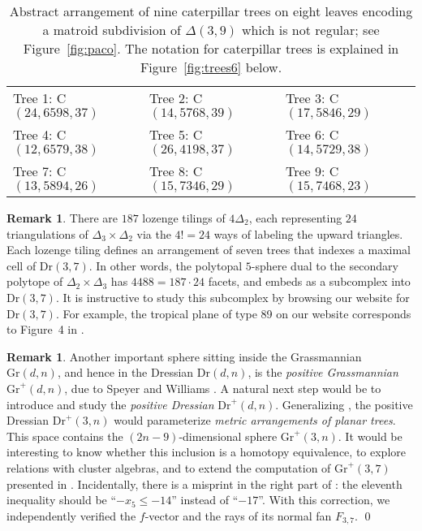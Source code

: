 \documentclass[12pt,a4paper]{amsart}
\theoremstyle{definition}
\newtheorem{remark}[thm]{Remark}
\newcommand{\Gr}{{\mathrm{Gr}}}
\newcommand{\Dr}{{\mathrm{Dr}}}
\begin{document}
\begin{table}[ht]\centering
  \caption{Abstract arrangement of nine caterpillar trees on eight
    leaves encoding a matroid subdivision of $\Delta(3,9)$ which is
    not regular; see Figure~\ref{fig:paco}.  The notation for
    caterpillar trees is explained in Figure~\ref{fig:trees6} below.}
  \renewcommand{\arraystretch}{0.9}
  \begin{tabular*}{.9\linewidth}{@{\extracolsep{\fill}}lll@{}}
    \toprule
    Tree 1: C$(24,6598,37)$ & Tree 2: C$(14,5768,39)$ & Tree 3: C$(17,5846,29)$ \\
    Tree 4: C$(12,6579,38)$ & Tree 5: C$(26,4198,37)$ & Tree 6: C$(14,5729,38)$ \\
    Tree 7: C$(13,5894,26)$ & Tree 8: C$(15,7346,29)$ & Tree 9: C$(15,7468,23)$ \\
    \bottomrule
  \end{tabular*}
  \label{tab:paco}
\end{table}

\begin{remark} 
  There are $187$ lozenge tilings of $4 \Delta_2$, each representing
  $24$ triangulations of $\Delta_3 \times \Delta_2$ via the $4! = 24$
  ways of labeling the upward triangles.  Each lozenge tiling defines
  an arrangement of seven trees that indexes a maximal cell of
  $\Dr(3,7)$.  In other words, the polytopal $5$-sphere dual to the
  secondary polytope of $\Delta_2 \times \Delta_3$ has $4488=187\cdot
  24$ facets, and embeds as a subcomplex into $\Dr(3,7)$.  It is
  instructive to study this subcomplex by browsing our website for
  $\Dr(3,7)$. For example, the tropical plane of type 89 on our
  website corresponds to Figure~4 in \cite{AD}.
\end{remark}

\begin{remark} 
  Another important sphere sitting inside the Grassmannian $\Gr(d,n)$,
  and hence in the Dressian $\Dr(d,n)$, is the \emph{positive
    Grassmannian} $\Gr^+(d,n)$, due to Speyer and Williams \cite{SW}.
  A natural next step would be to introduce and study the
  \emph{positive Dressian} $\Dr^+(d,n)$.  Generalizing \cite[\S
  5]{SW}, the positive Dressian $\Dr^+(3,n)$ would parameterize
  \emph{metric arrangements of planar trees}.  This space contains the
  $(2n-9)$-dimensional sphere $\Gr^+(3,n)$.  It would be interesting
  to know whether this inclusion is a homotopy equivalence, to explore
  relations with cluster algebras, and to extend the computation of
  $\Gr^+(3,7)$ presented in \cite{SW}. Incidentally, there is a
  misprint in the right part of \cite[Table 2]{SW}: the eleventh
  inequality should be ``$-x_5\leq -14$'' instead of ``$-17$''. With
  this correction, we independently verified the $f$-vector and the
  rays of its normal fan $F_{3,7}$.  \qed
\end{remark}
\end{document}
